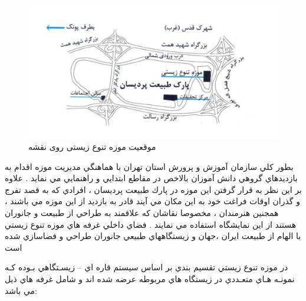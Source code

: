 \begin{figure}
    \label{fig2.1}
    \centering
    \includegraphics[scale = 0.5]{images/map.PNG}
    \caption{موقعیت موزه تنوع زیستی روی نقشه}
\end{figure}

بطور كلي سازمان آموزش و پرورش استان تهران با هماهنگي مديريت موزه اقدام به بازديدهاي گروهي دانش
آموزان بالاخص در مقاطع ابتدايي و راهنمايي مي نمايد . علاوه بر اين نظر به قرار گرفتن اين موزه در پارك
طبيعت پرديسان ، افرادي كه به قصد تفرج و گذران اوقات فراغت خود به اين مكان مي آيند قادر به بازديد از
اين موزه مي باشند ، همجنين هنرمندان ، مخصوصا نقاشان كه علاقمند به طراحي از طبيعت و جانوران
هستند از اين نمايشگاه استفاده مي نمايند . فضاي داخلي غرفه هاي موزه تنوع زيستي با الهام از طبيعت ايران
،جهان و زيستگاههاي طبيعي جانوران طراحي و فضاسازي شده است

در موزه تنوع زيستي تقسيم بندي بر اساس سيستم قاره اي – زيسـتگاهي بـوده كـه نمونـه هـاي متعـددي در
زيستگاه هاي مربوطه عرضه شده اند و شامل غرفه هاي ذيل مي باشد:

